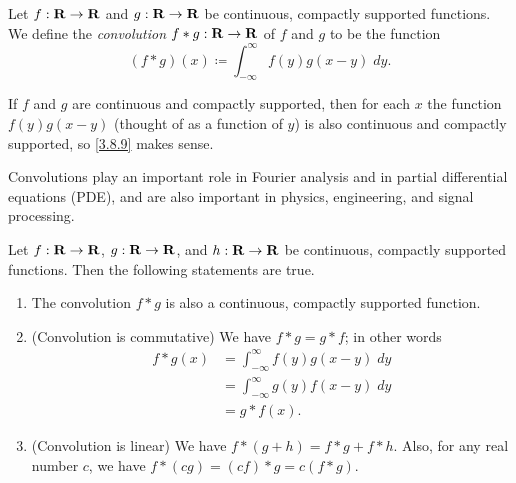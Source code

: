 \begin{definition}[Convolution]\label{3.8.9}
  Let \(f : \mathbf{R} \to \mathbf{R}\) and \(g : \mathbf{R} \to \mathbf{R}\) be continuous, compactly supported functions.
  We define the \emph{convolution} \(f * g : \mathbf{R} \to \mathbf{R}\) of \(f\) and \(g\) to be the function
  \[
    (f * g)(x) \coloneqq \int_{-\infty}^\infty f(y) g(x - y) \; dy.
  \]
\end{definition}

\begin{note}
  If \(f\) and \(g\) are continuous and compactly supported, then for each \(x\) the function \(f(y) g(x - y)\) (thought of as a function of \(y\)) is also continuous and compactly supported, so \cref{3.8.9} makes sense.
\end{note}

\begin{remark}\label{3.8.10}
  Convolutions play an important role in Fourier analysis and in partial differential equations (PDE), and are also important in physics, engineering, and signal processing.
\end{remark}

\begin{proposition}\label{3.8.11}
  Let \(f : \mathbf{R} \to \mathbf{R}\), \(g : \mathbf{R} \to \mathbf{R}\), and \(h : \mathbf{R} \to \mathbf{R}\) be continuous, compactly supported functions.
  Then the following statements are true.
  \begin{enumerate}
    \item The convolution \(f * g\) is also a continuous, compactly supported function.
    \item (Convolution is commutative)
          We have \(f * g = g * f\);
          in other words
          \begin{align*}
            f * g(x) & = \int_{-\infty}^\infty f(y) g(x - y) \; dy \\
                     & = \int_{-\infty}^\infty g(y) f(x - y) \; dy \\
                     & = g * f(x).
          \end{align*}
    \item (Convolution is linear)
          We have \(f * (g + h) = f * g + f * h\).
          Also, for any real number \(c\), we have \(f * (cg) = (cf) * g = c(f * g)\).
  \end{enumerate}
\end{proposition}

